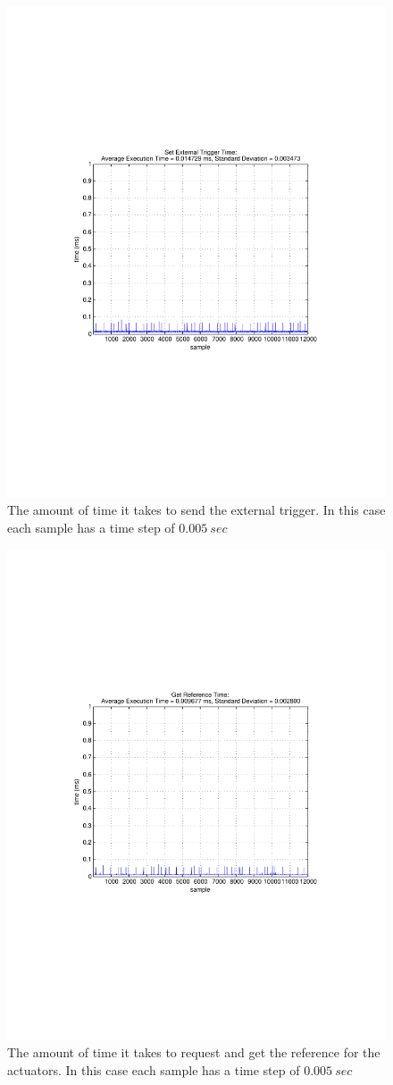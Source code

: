 





\begin{figure}[thpb]
  \centering
\includegraphics[width=0.6\columnwidth]{./timingData/getTrigger.pdf}
  \caption{The amount of time it takes to send the external trigger.  In this case each sample has a time step of $0.005~sec$}
  \label{fig:timing-getTrigger}
\end{figure}





\begin{figure}[thpb]
  \centering
\includegraphics[width=0.6\columnwidth]{./timingData/getRef.pdf}
  \caption{The amount of time it takes to request and get the reference for the actuators.  In this case each sample has a time step of $0.005~sec$}
  \label{fig:timing-getRef}
\end{figure}






